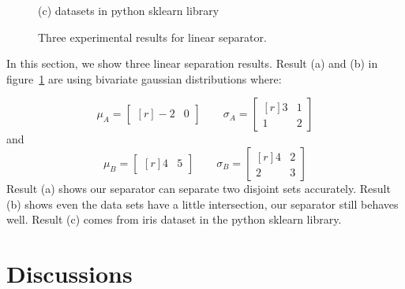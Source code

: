 \documentclass{article}
\begin{document}
\begin{figure}[h]
\begin{minipage}[h]{1.0\linewidth}
		\centerline{(c) datasets in python sklearn library}\medskip
	\end{minipage}
	\caption{Three experimental results for linear separator.}
	\label{fig:experimental}
\end{figure}
In this section, we show three linear separation results. Result (a) and (b) in figure~\ref{fig:experimental} are
using bivariate gaussian distributions where:

\[
	\mu_A=\begin{bmatrix*}[r]
		-2 & 0
	\end{bmatrix*}\qquad
	\sigma_A=\begin{bmatrix*}[r]
		3 & 1 \\
		1 & 2
	\end{bmatrix*}
\]
and
\[
	\mu_B=\begin{bmatrix*}[r]
		4 & 5
	\end{bmatrix*}\qquad
	\sigma_B=\begin{bmatrix*}[r]
		4  & 2 \\
		2 & 3
	\end{bmatrix*}
\]
Result (a) shows our separator can separate two disjoint sets accurately. Result (b) shows even the data sets have a little intersection, our 
separator still behaves
well. Result (c) comes from iris dataset in the python sklearn library.
\section{Discussions}
\end{document}
